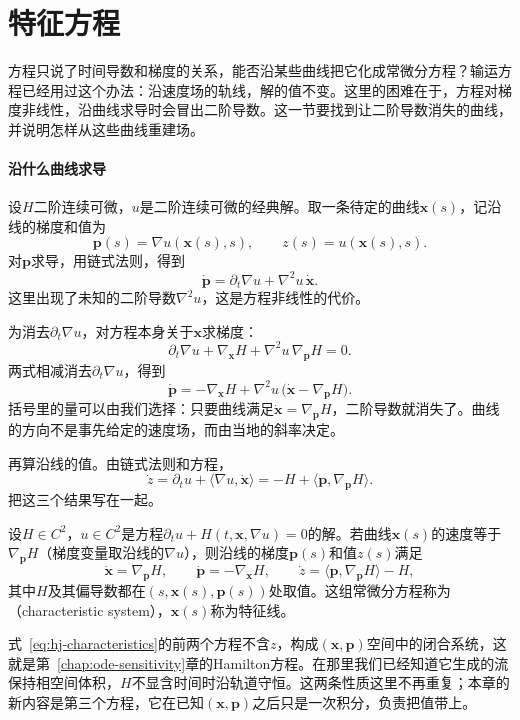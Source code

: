 \section{特征方程}
\label{sec:hj-characteristics}

方程只说了时间导数和梯度的关系，能否沿某些曲线把它化成常微分方程？输运方程已经用过这个办法：沿速度场的轨线，解的值不变。这里的困难在于，方程对梯度非线性，沿曲线求导时会冒出二阶导数。这一节要找到让二阶导数消失的曲线，并说明怎样从这些曲线重建场。

\paragraph{沿什么曲线求导}
设$H$二阶连续可微，$u$是二阶连续可微的经典解。取一条待定的曲线$\bm{x}(s)$，记沿线的梯度和值为
\[
  \bm{p}(s)=\nabla u(\bm{x}(s),s),\qquad z(s)=u(\bm{x}(s),s).
\]
对$\bm{p}$求导，用链式法则，得到
\[
  \dot{\bm{p}}=\partial_t\nabla u+\nabla^2u\,\dot{\bm{x}}.
\]
这里出现了未知的二阶导数$\nabla^2u$，这是方程非线性的代价。

为消去$\partial_t\nabla u$，对方程本身关于$\bm{x}$求梯度：
\[
  \partial_t\nabla u+\nabla_{\bm{x}}H+\nabla^2u\,\nabla_{\bm{p}}H=0.
\]
两式相减消去$\partial_t\nabla u$，得到
\[
  \dot{\bm{p}}=-\nabla_{\bm{x}}H+\nabla^2u\,\bigl(\dot{\bm{x}}-\nabla_{\bm{p}}H\bigr).
\]
括号里的量可以由我们选择：只要曲线满足$\dot{\bm{x}}=\nabla_{\bm{p}}H$，二阶导数就消失了。曲线的方向不是事先给定的速度场，而由当地的斜率决定。

再算沿线的值。由链式法则和方程，
\[
  \dot{z}=\partial_tu+\langle\nabla u,\dot{\bm{x}}\rangle=-H+\langle\bm{p},\nabla_{\bm{p}}H\rangle.
\]
把这三个结果写在一起。

\begin{theorem}[特征方程组]
\label{thm:hj-characteristics}
设$H\in C^2$，$u\in C^2$是方程$\partial_tu+H(t,\bm{x},\nabla u)=0$的解。若曲线$\bm{x}(s)$的速度等于$\nabla_{\bm{p}}H$（梯度变量取沿线的$\nabla u$），则沿线的梯度$\bm{p}(s)$和值$z(s)$满足
\begin{equation}
  \dot{\bm{x}}=\nabla_{\bm{p}}H,\qquad
  \dot{\bm{p}}=-\nabla_{\bm{x}}H,\qquad
  \dot{z}=\langle\bm{p},\nabla_{\bm{p}}H\rangle-H,
  \label{eq:hj-characteristics}
\end{equation}
其中$H$及其偏导数都在$(s,\bm{x}(s),\bm{p}(s))$处取值。这组常微分方程称为（characteristic system），$\bm{x}(s)$称为特征线。
\end{theorem}

式~\eqref{eq:hj-characteristics}的前两个方程不含$z$，构成$(\bm{x},\bm{p})$空间中的闭合系统，这就是第~\ref{chap:ode-sensitivity}章的Hamilton方程。在那里我们已经知道它生成的流保持相空间体积，$H$不显含时间时沿轨道守恒。这两条性质这里不再重复；本章的新内容是第三个方程，它在已知$(\bm{x},\bm{p})$之后只是一次积分，负责把值带上。

